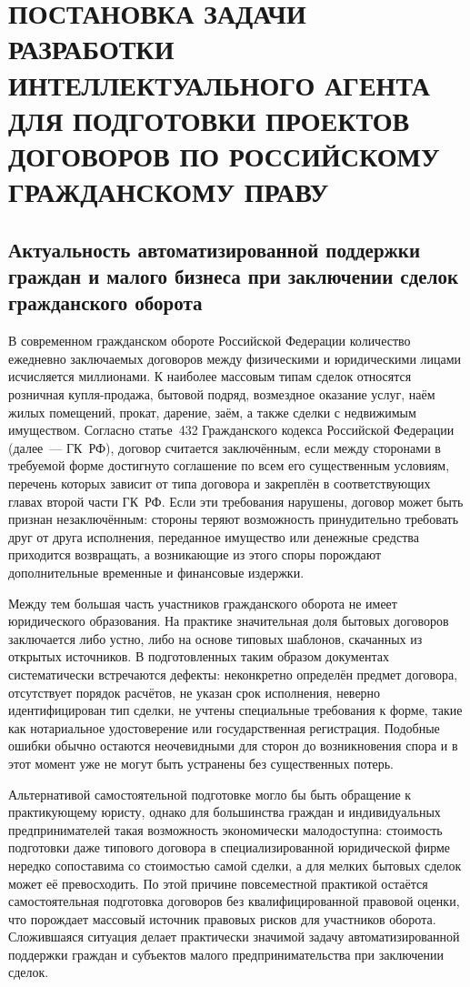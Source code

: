


\section{ПОСТАНОВКА ЗАДАЧИ РАЗРАБОТКИ ИНТЕЛЛЕКТУАЛЬНОГО АГЕНТА ДЛЯ ПОДГОТОВКИ ПРОЕКТОВ ДОГОВОРОВ ПО РОССИЙСКОМУ ГРАЖДАНСКОМУ ПРАВУ}

\subsection{Актуальность автоматизированной поддержки граждан и малого бизнеса при заключении сделок гражданского оборота}

В современном гражданском обороте Российской Федерации количество ежедневно заключаемых договоров между физическими и юридическими лицами исчисляется миллионами. К наиболее массовым типам сделок относятся розничная купля-продажа, бытовой подряд, возмездное оказание услуг, наём жилых помещений, прокат, дарение, заём, а также сделки с недвижимым имуществом. Согласно статье~432 Гражданского кодекса Российской Федерации~\cite{gk_rf_part1,gk_rf_part2} (далее~--- ГК~РФ), договор считается заключённым, если между сторонами в требуемой форме достигнуто соглашение по всем его существенным условиям, перечень которых зависит от типа договора и закреплён в соответствующих главах второй части ГК~РФ. Если эти требования нарушены, договор может быть признан незаключённым: стороны теряют возможность принудительно требовать друг от друга исполнения, переданное имущество или денежные средства приходится возвращать, а возникающие из этого споры порождают дополнительные временные и финансовые издержки.

Между тем большая часть участников гражданского оборота не имеет юридического образования. На практике значительная доля бытовых договоров заключается либо устно, либо на основе типовых шаблонов, скачанных из открытых источников. В подготовленных таким образом документах систематически встречаются дефекты: неконкретно определён предмет договора, отсутствует порядок расчётов, не указан срок исполнения, неверно идентифицирован тип сделки, не учтены специальные требования к форме, такие как нотариальное удостоверение или государственная регистрация. Подобные ошибки обычно остаются неочевидными для сторон до возникновения спора и в этот момент уже не могут быть устранены без существенных потерь.

Альтернативой самостоятельной подготовке могло бы быть обращение к практикующему юристу, однако для большинства граждан и индивидуальных предпринимателей такая возможность экономически малодоступна: стоимость подготовки даже типового договора в специализированной юридической фирме нередко сопоставима со стоимостью самой сделки, а для мелких бытовых сделок может её превосходить. По этой причине повсеместной практикой остаётся самостоятельная подготовка договоров без квалифицированной правовой оценки, что порождает массовый источник правовых рисков для участников оборота. Сложившаяся ситуация делает практически значимой задачу автоматизированной поддержки граждан и субъектов малого предпринимательства при заключении сделок.

